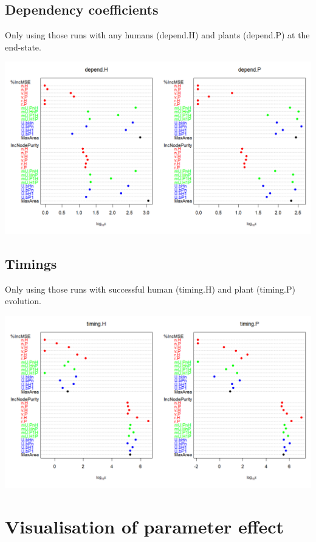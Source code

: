 \documentclass[
]{book}
\begin{document}
\newpage

\hypertarget{dependency-coefficients}{%
\subsection{Dependency coefficients}\label{dependency-coefficients}}

Only using those runs with any humans (depend.H) and plants (depend.P) at the end-state.

\includegraphics[width=1\linewidth]{plots/5_multiplePar-RF-depend}

\hypertarget{timings}{%
\subsection{Timings}\label{timings}}

Only using those runs with successful human (timing.H) and plant (timing.P) evolution.

\includegraphics[width=1\linewidth]{plots/5_multiplePar-RF-timing}

\newpage

\hypertarget{visualisation-of-parameter-effect}{%
\section{Visualisation of parameter effect}\label{visualisation-of-parameter-effect}}
\end{document}
